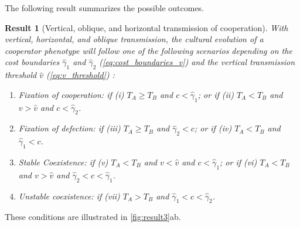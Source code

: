 \documentclass[12pt]{extarticle}
\newtheorem{result}{Result}
\begin{document}
{The following result summarizes the possible outcomes.
\\

\begin{result}[Vertical, oblique, and horizontal transmission of cooperation] \label{result:vert_obli_hori}
With vertical, horizontal, and oblique transmission, the cultural evolution of a cooperator phenotype will follow one of the following scenarios depending on the cost boundaries $\hat\gamma_1$ and $\hat\gamma_2$ (\autoref{eq:cost_boundaries_v}) and the vertical transmission threshold $\hat v$ (\autoref{eq:v_threshold}) :


\begin{enumerate}
\item \emph{Fixation of cooperation}: 
	if \emph{(i)} $T_A \ge T_B$ and $c < \hat\gamma_1$; or 
	if \emph{(ii)} $T_A < T_B$ and $v>\hat v$ and $c < \hat\gamma_2$.
\item \emph{Fixation of defection}: 
    if \emph{(iii)} $T_A \ge T_B$ and $\hat\gamma_2 < c$; or 
	if \emph{(iv)} $T_A < T_B$ and $\hat\gamma_1 < c$.
\item \emph{Stable Coexistence}: 
    if \emph{(v)} $T_A < T_B$ and $v<\hat{v}$ and $c < \hat\gamma_1$; or 
    if \emph{(vi)} $T_A < T_B$ and $v>\hat{v}$ and $\hat\gamma_2 < c < \hat\gamma_1$.
\item \emph{Unstable coexistence}:
    if \emph{(vii)} $T_A > T_B$ and $\hat\gamma_1 < c < \hat\gamma_2$.
\end{enumerate}

\end{result}
These conditions are illustrated in \autoref{fig:result3}ab.

}
\end{document}
